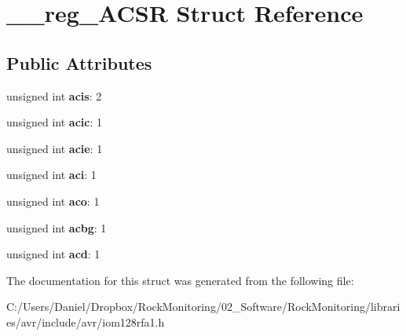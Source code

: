 \hypertarget{struct____reg___a_c_s_r}{}\section{\+\_\+\+\_\+reg\+\_\+\+A\+C\+SR Struct Reference}
\label{struct____reg___a_c_s_r}
\subsection*{Public Attributes}
\begin{DoxyCompactItemize}
\item 
unsigned int {\bfseries acis}\+: 2\hypertarget{struct____reg___a_c_s_r_a3485fb2432f3d52ca37e590d41471f20}{}\label{struct____reg___a_c_s_r_a3485fb2432f3d52ca37e590d41471f20}

\item 
unsigned int {\bfseries acic}\+: 1\hypertarget{struct____reg___a_c_s_r_adbcca4796b5d08481a8fb13b831d75a4}{}\label{struct____reg___a_c_s_r_adbcca4796b5d08481a8fb13b831d75a4}

\item 
unsigned int {\bfseries acie}\+: 1\hypertarget{struct____reg___a_c_s_r_a72490d9892b2e4ded128df8397efdac5}{}\label{struct____reg___a_c_s_r_a72490d9892b2e4ded128df8397efdac5}

\item 
unsigned int {\bfseries aci}\+: 1\hypertarget{struct____reg___a_c_s_r_a31568947db59ffa8bb29e0c198d6c465}{}\label{struct____reg___a_c_s_r_a31568947db59ffa8bb29e0c198d6c465}

\item 
unsigned int {\bfseries aco}\+: 1\hypertarget{struct____reg___a_c_s_r_aade4b2fc767d1d432d7acccacb2a5e49}{}\label{struct____reg___a_c_s_r_aade4b2fc767d1d432d7acccacb2a5e49}

\item 
unsigned int {\bfseries acbg}\+: 1\hypertarget{struct____reg___a_c_s_r_ad7c4e4708b156c8b9a1c3ead41d14d22}{}\label{struct____reg___a_c_s_r_ad7c4e4708b156c8b9a1c3ead41d14d22}

\item 
unsigned int {\bfseries acd}\+: 1\hypertarget{struct____reg___a_c_s_r_a0cf51dc8b8024ae03ce599bd4e303f48}{}\label{struct____reg___a_c_s_r_a0cf51dc8b8024ae03ce599bd4e303f48}

\end{DoxyCompactItemize}


The documentation for this struct was generated from the following file\+:\begin{DoxyCompactItemize}
\item 
C\+:/\+Users/\+Daniel/\+Dropbox/\+Rock\+Monitoring/02\+\_\+\+Software/\+Rock\+Monitoring/libraries/avr/include/avr/iom128rfa1.\+h\end{DoxyCompactItemize}
